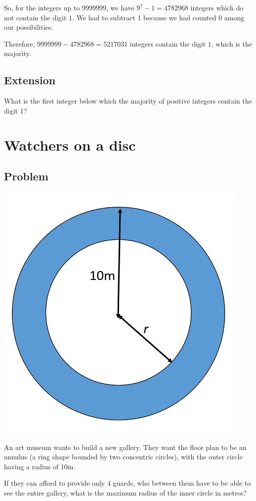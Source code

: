 \documentclass{book}
\begin{document}
So, for the integers up to 9999999, we have \(9^7-1=4782968\) integers which do not contain the digit \(1\). We had to subtract 1 because we had counted 0 among our possibilities.

Therefore, \(9999999-4782968=5217031\) integers contain the digit \(1\), which is the majority.
\subsection{Extension}
What is the first integer below which the majority of positive integers contain the digit \(1\)?
\newpage
\section{Watchers on a disc}
\subsection{Problem}

\begin{center}
\includegraphics{annulus.jpg}
\end{center}

An art museum wants to build a new gallery. They want the floor plan to be an annulus (a ring shape bounded by two concentric circles), with the outer circle having a radius of 10m.

If they can afford to provide only \(4\) guards, who between them have to be able to see the entire gallery, what is the maximum radius of the inner circle in metres?
\end{document}
